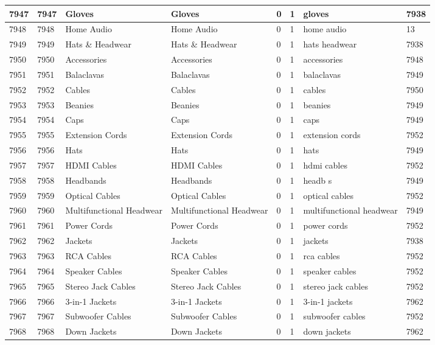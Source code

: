 \begin{longtable}{|l|l|l|l|l|l|l|l|}
7947 & 7947 & Gloves & Gloves & 0 & 1 & gloves & 7938 \\ \hline 
7948 & 7948 & Home Audio & Home Audio & 0 & 1 & home audio & 13 \\ \hline 
7949 & 7949 & Hats \& Headwear & Hats \& Headwear & 0 & 1 & hats headwear & 7938 \\ \hline 
7950 & 7950 & Accessories & Accessories & 0 & 1 & accessories & 7948 \\ \hline 
7951 & 7951 & Balaclavas & Balaclavas & 0 & 1 & balaclavas & 7949 \\ \hline 
7952 & 7952 & Cables & Cables & 0 & 1 & cables & 7950 \\ \hline 
7953 & 7953 & Beanies & Beanies & 0 & 1 & beanies & 7949 \\ \hline 
7954 & 7954 & Caps & Caps & 0 & 1 & caps & 7949 \\ \hline 
7955 & 7955 & Extension Cords & Extension Cords & 0 & 1 & extension cords & 7952 \\ \hline 
7956 & 7956 & Hats & Hats & 0 & 1 & hats & 7949 \\ \hline 
7957 & 7957 & HDMI Cables & HDMI Cables & 0 & 1 & hdmi cables & 7952 \\ \hline 
7958 & 7958 & Headbands & Headbands & 0 & 1 & headb s & 7949 \\ \hline 
7959 & 7959 & Optical Cables & Optical Cables & 0 & 1 & optical cables & 7952 \\ \hline 
7960 & 7960 & Multifunctional Headwear & Multifunctional Headwear & 0 & 1 & multifunctional headwear & 7949 \\ \hline 
7961 & 7961 & Power Cords & Power Cords & 0 & 1 & power cords & 7952 \\ \hline 
7962 & 7962 & Jackets & Jackets & 0 & 1 & jackets & 7938 \\ \hline 
7963 & 7963 & RCA Cables & RCA Cables & 0 & 1 & rca cables & 7952 \\ \hline 
7964 & 7964 & Speaker Cables & Speaker Cables & 0 & 1 & speaker cables & 7952 \\ \hline 
7965 & 7965 & Stereo Jack Cables & Stereo Jack Cables & 0 & 1 & stereo jack cables & 7952 \\ \hline 
7966 & 7966 & 3-in-1 Jackets & 3-in-1 Jackets & 0 & 1 & 3-in-1 jackets & 7962 \\ \hline 
7967 & 7967 & Subwoofer Cables & Subwoofer Cables & 0 & 1 & subwoofer cables & 7952 \\ \hline 
7968 & 7968 & Down Jackets & Down Jackets & 0 & 1 & down jackets & 7962 \\ \hline 

\end{longtable}
